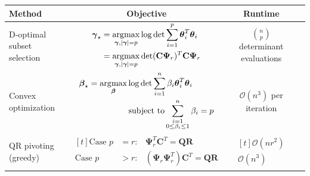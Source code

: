 \documentclass[letterpaper]{IEEEtran}
\newcommand{\bc}{\mathbf{c}}
\newcommand{\bC}{\mathbf{C}}
\newcommand{\bR}{\mathbf{R}}
\newcommand{\bQ}{\mathbf{Q}}
\newcommand{\bPsi}{\mathbf{\Psi}}
\DeclareMathOperator*{\argmax}{arg\rm{}max}
\DeclareMathOperator*{\logdet}{log\rm{}det}
\DeclareMathOperator*{\subjto}{subject~to}
\newcommand{\btheta}{\boldsymbol{\theta}}
\newcommand{\Ind}{\boldsymbol{\gamma}}
\begin{document}
\begin{table}%
\centering
{} \label{tab:LpTable} 	
		\noindent \begin{tabular}{|l| c| c| c| } 
			\hline
			{\bf Method} & {\bf Objective} & {\bf Runtime} \\
			\hline 			
			D-optimal subset selection  & $\begin{aligned}
			\Ind_{\star} &=
			\argmax_{\Ind,|\Ind|=p} \log \det \sum_{i=1}^p \btheta_{i}^T\btheta_{i} \nonumber \\
			&= \argmax_{\Ind,|\Ind|=p} \det (\bC\bPsi_r)^T\bC\bPsi_r
			\end{aligned}$ & $n\choose p$ determinant evaluations \tabularnewline \hline  %
			Convex optimization  &$\begin{aligned}
			\boldsymbol{\beta}_{\star} = \argmax_{\boldsymbol{\beta}} &\log \det \sum_{i=1}^n \beta_i\btheta_{i}^T\btheta_{i} \nonumber \\
			&\subjto \sum_{\substack{i=1 \\ 0\le\beta_i\le 1}}^n \beta_i = p
			\end{aligned}$ & $\mathcal{O}(n^3)$ per iteration  \tabularnewline \hline %
			QR pivoting (greedy)  & $\begin{aligned}[t]\mbox{Case } p&=r: &\bPsi_r^T\bC^T = \bQ\bR \\ \mbox{Case } p&>r : &(\bPsi_r\bPsi_r^T)\bC^T = \bQ\bR\end{aligned}$ & $\begin{aligned}[t]\mathcal{O}(nr^2)  \\ \mathcal{O}(n^3)\end{aligned}$ \\
			\hline
		\end{tabular}
\end{table}
\end{document}
